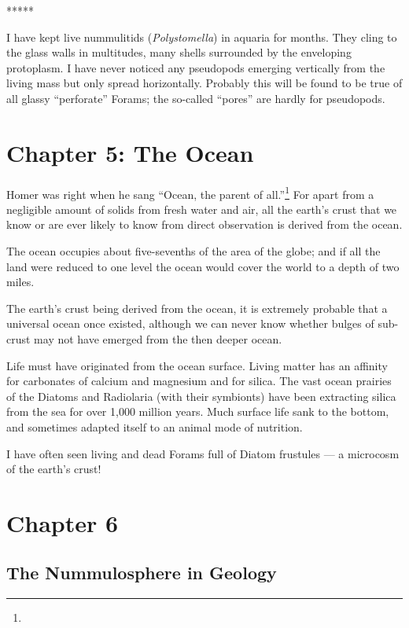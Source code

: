 \documentclass[a4paper, 12pt, oneside]{article}
\begin{document}
\centerline{*\hspace{15mm}*\hspace{15mm}*\hspace{15mm}*\hspace{15mm}*}
\bigskip

I have kept live nummulitids (\emph{Polystomella}) in aquaria for months. They cling to the glass walls in multitudes, many shells surrounded by the enveloping protoplasm. I have never noticed any pseudopods emerging vertically from the living mass but only spread horizontally. Probably this will be found to be true of all glassy ``perforate'' Forams; the so-called ``pores'' are hardly for pseudopods.
\clearpage
\section{Chapter 5: The Ocean}
\paragraph{}
Homer was right when he sang ``Ocean, the parent of all.''\footnote{} For apart from a negligible amount of solids from fresh water and air, all the earth's crust that we know or are ever likely to know from direct observation is derived from the ocean.

The ocean occupies about five-sevenths of the area of the globe; and if all the land were reduced to one level the ocean would cover the world to a depth of two miles.

The earth's crust being derived from the ocean, it is extremely probable that a universal ocean once existed, although we can never know whether bulges of sub-crust may not have emerged from the then deeper ocean.

Life must have originated from the ocean surface. Living matter has an affinity for carbonates of calcium and magnesium and for silica. The vast ocean prairies of the Diatoms and Radiolaria (with their symbionts) have been extracting silica from the sea for over 1,000 million years. Much surface life sank to the bottom, and sometimes adapted itself to an animal mode of nutrition.

I have often seen living and dead Forams full of Diatom frustules --- a microcosm of the earth's crust!
\clearpage
\section{Chapter 6}
\subsection{The Nummulosphere in Geology}
\end{document}
